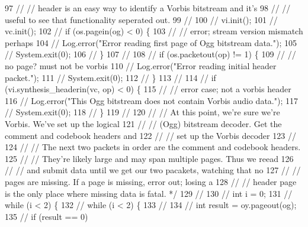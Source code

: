 \begin{DoxyCode}
97 \textcolor{comment}{//          // header is an easy way to identify a Vorbis bitstream and it's}
98 \textcolor{comment}{//          // useful to see that functionality seperated out.}
99 \textcolor{comment}{//}
100 \textcolor{comment}{//          vi.init();}
101 \textcolor{comment}{//          vc.init();}
102 \textcolor{comment}{//          if (os.pagein(og) < 0) \{}
103 \textcolor{comment}{//              // error; stream version mismatch perhaps}
104 \textcolor{comment}{//              Log.error("Error reading first page of Ogg bitstream data.");}
105 \textcolor{comment}{//              System.exit(0);}
106 \textcolor{comment}{//          \}}
107 \textcolor{comment}{//}
108 \textcolor{comment}{//          if (os.packetout(op) != 1) \{}
109 \textcolor{comment}{//              // no page? must not be vorbis}
110 \textcolor{comment}{//              Log.error("Error reading initial header packet.");}
111 \textcolor{comment}{//              System.exit(0);}
112 \textcolor{comment}{//          \}}
113 \textcolor{comment}{//}
114 \textcolor{comment}{//          if (vi.synthesis\_headerin(vc, op) < 0) \{}
115 \textcolor{comment}{//              // error case; not a vorbis header}
116 \textcolor{comment}{//              Log.error("This Ogg bitstream does not contain Vorbis audio data.");}
117 \textcolor{comment}{//              System.exit(0);}
118 \textcolor{comment}{//          \}}
119 \textcolor{comment}{//}
120 \textcolor{comment}{//          // At this point, we're sure we're Vorbis.  We've set up the logical}
121 \textcolor{comment}{//          // (Ogg) bitstream decoder.  Get the comment and codebook headers and}
122 \textcolor{comment}{//          // set up the Vorbis decoder}
123 \textcolor{comment}{//}
124 \textcolor{comment}{//          // The next two packets in order are the comment and codebook headers.}
125 \textcolor{comment}{//          // They're likely large and may span multiple pages.  Thus we reead}
126 \textcolor{comment}{//          // and submit data until we get our two pacakets, watching that no}
127 \textcolor{comment}{//          // pages are missing.  If a page is missing, error out; losing a}
128 \textcolor{comment}{//          // header page is the only place where missing data is fatal. */}
129 \textcolor{comment}{//}
130 \textcolor{comment}{//          int i = 0;}
131 \textcolor{comment}{//          while (i < 2) \{}
132 \textcolor{comment}{//              while (i < 2) \{}
133 \textcolor{comment}{//}
134 \textcolor{comment}{//                  int result = oy.pageout(og);}
135 \textcolor{comment}{//                  if (result == 0)}

\end{DoxyCode}
